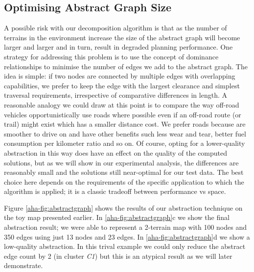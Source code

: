 \subsection{Optimising Abstract Graph Size}
A possible risk with our decomposition algorithm is that as the number of terrains in the environment increase the size of the abstract graph will become larger and larger and in turn, result in degraded planning performance. One strategy for addressing this problem is to use the concept of dominance relationships to minimise the number of edges we add to the abstract graph. The idea is simple: if two nodes are connected by multiple edges with overlapping capabilities, we prefer to keep the edge with the largest clearance and simplest traversal requirements, irrespective of comparative differences in length. A reasonable analogy we could draw at this point is to compare the way off-road vehicles opportunistically use roads where possible even if an off-road route (or trail) might exist which has a smaller distance cost. We prefer roads because are smoother to drive on and have other benefits such less wear and tear, better fuel consumption per kilometer ratio and so on. Of course, opting for a lower-quality abstraction in this way does have an effect on the quality of the computed solutions, but as we will show in our experimental analysis, the differences are reasonably small and the solutions still near-optimal for our test data. The best choice here depends on the requirements of the specific application to which the algorithm is applied; it is a classic tradeoff between performance vs space.

Figure \ref{aha-fig:abstractgraph} shows the results of our abstraction technique on the toy map presented earlier. In \ref{aha-fig:abstractgraph}c we show the final abstraction result; we were able to represent a 2-terrain map with 100 nodes and 350 edges using just 13 nodes and  23 edges. In \ref{aha-fig:abstractgraph}d we show a low-quality abstraction. In this trival example we could only reduce the abstract edge count by 2 (in cluster \emph{C1}) but this is an atypical result as we will later demonstrate.

